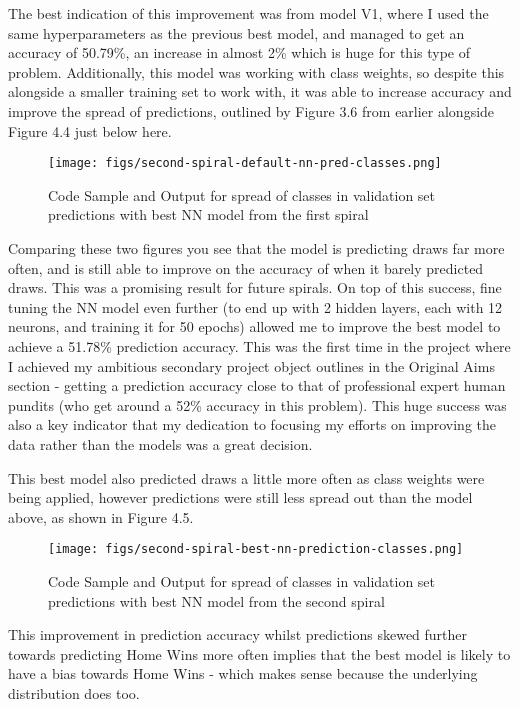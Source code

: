 \documentclass[12pt,a4paper,twoside,openright]{report}
\begin{document}
The best indication of this improvement was from model V1, where I used the same hyperparameters as the previous best model, and managed to get an accuracy of 50.79\%, an increase in almost 2\% which is huge for this type of problem. Additionally, this model was working with class weights, so despite this alongside a smaller training set to work with, it was able to increase accuracy and improve the spread of predictions, outlined by Figure 3.6 from earlier alongside Figure 4.4 just below here.

\begin{figure}[h]
  \centering
  \texttt{[image: figs/second-spiral-default-nn-pred-classes.png]}
  \caption{Code Sample and Output for spread of classes in validation set predictions with best NN model from the first spiral}
  \label{fig:second-spiral-default-nn-pred-classes}
\end{figure}

Comparing these two figures you see that the model is predicting draws far more often, and is still able to improve on the accuracy of when it barely predicted draws. This was a promising result for future spirals. On top of this success, fine tuning the NN model even further (to end up with 2 hidden layers, each with 12 neurons, and training it for 50 epochs) allowed me to improve the best model to achieve a 51.78\% prediction accuracy. This was the first time in the project where I achieved my ambitious secondary project object outlines in the Original Aims section - getting a prediction accuracy close to that of professional expert human pundits (who get around a 52\% accuracy in this problem). This huge success was also a key indicator that my dedication to focusing my efforts on improving the data rather than the models was a great decision.

This best model also predicted draws a little more often as class weights were being applied, however predictions were still less spread out than the model above, as shown in Figure 4.5.

\begin{figure}[h]
  \centering
  \texttt{[image: figs/second-spiral-best-nn-prediction-classes.png]}
  \caption{Code Sample and Output for spread of classes in validation set predictions with best NN model from the second spiral}
  \label{fig:second-spiral-best-nn-pred-classes}
\end{figure}

This improvement in prediction accuracy whilst predictions skewed further towards predicting Home Wins more often implies that the best model is likely to have a bias towards Home Wins - which makes sense because the underlying distribution does too.
\end{document}
